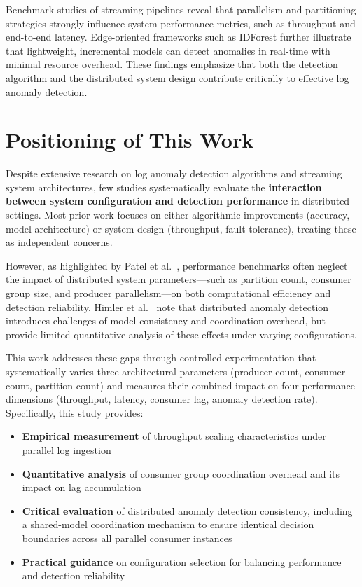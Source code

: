 \documentclass[12pt,a4paper]{report}
\begin{document}
Benchmark studies of streaming pipelines \cite{Patel2024} reveal that parallelism and partitioning strategies strongly influence system performance metrics, such as throughput and end-to-end latency. Edge-oriented frameworks such as IDForest \cite{IDForest2022} further illustrate that lightweight, incremental models can detect anomalies in real-time with minimal resource overhead. These findings emphasize that both the detection algorithm and the distributed system design contribute critically to effective log anomaly detection.

\section{Positioning of This Work}

Despite extensive research on log anomaly detection algorithms and streaming system architectures, few studies systematically evaluate the \textbf{interaction between system configuration and detection performance} in distributed settings. Most prior work focuses on either algorithmic improvements (accuracy, model architecture) or system design (throughput, fault tolerance), treating these as independent concerns.

However, as highlighted by Patel et al.\ \cite{Patel2024}, performance benchmarks often neglect the impact of distributed system parameters---such as partition count, consumer group size, and producer parallelism---on both computational efficiency and detection reliability. Himler et al.\ \cite{Himler2024} note that distributed anomaly detection introduces challenges of model consistency and coordination overhead, but provide limited quantitative analysis of these effects under varying configurations.

This work addresses these gaps through controlled experimentation that systematically varies three architectural parameters (producer count, consumer count, partition count) and measures their combined impact on four performance dimensions (throughput, latency, consumer lag, anomaly detection rate). Specifically, this study provides:

\begin{itemize}
    \item \textbf{Empirical measurement} of throughput scaling characteristics under parallel log ingestion
    \item \textbf{Quantitative analysis} of consumer group coordination overhead and its impact on lag accumulation
    \item \textbf{Critical evaluation} of distributed anomaly detection consistency,
including a shared-model coordination mechanism to ensure identical decision boundaries
across all parallel consumer instances
    \item \textbf{Practical guidance} on configuration selection for balancing performance and detection reliability
\end{itemize}
\end{document}
